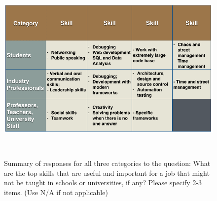 \documentclass{sigchi}
\begin{document}
\begin{figure}
\centering
  \includegraphics[width=1.05\columnwidth]{figures/skills}
  \caption{Summary of responses for all three categories to the question: What are the top skills that are useful and important for a job that might not be taught in schools or universities, if any? Please specify 2-3 items. (Use N/A if not applicable)}~\label{fig:figure9}
\end{figure}
\end{document}
